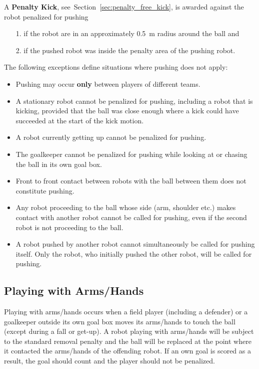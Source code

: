 A \textbf{Penalty Kick}, see~Section~\ref{sec:penalty_free_kick}, is awarded against the robot penalized for pushing
\begin{itemize}
  \item[1.] if the robot are in an approximately \qty{0.5}{\metre} radius around the ball and
  \item[2.] if the pushed robot was inside the penalty area of the pushing robot.
\end{itemize}

The following exceptions define situations where pushing does not apply:

\begin{itemize}
  \item Pushing may occur \textbf{only} between players of different teams.
  \item A stationary robot cannot be penalized for pushing, including a robot that is kicking, provided that the ball was close enough where a kick could have succeeded at the start of the kick motion.
  \item A robot currently getting up cannot be penalized for pushing.
  \item The goalkeeper cannot be penalized for pushing while looking at or chasing the ball in its own goal box.
  \item Front to front contact between robots with the ball between them does not constitute pushing.
  \item Any robot proceeding to the ball whose side (\ie arm, shoulder etc.) makes contact with another robot cannot be called for pushing, even if the second robot is not proceeding to the ball.
  \item A robot pushed by another robot cannot simultaneously be called for pushing itself. Only the robot, who initially pushed the other robot, will be called for pushing.
\end{itemize}

\subsection{Playing with Arms/Hands}
\label{sec:hand_ball}

Playing with arms/hands occurs when a field player (including a defender) or a goalkeeper outside its own goal box moves its arms/hands to touch the ball (except during a fall or get-up). A robot playing with arms/hands will be subject to the standard removal penalty and the ball will be replaced at the point where it contacted the arms/hands of the offending robot.  If an own goal is scored as a result, the goal should count and the player should not be penalized.

